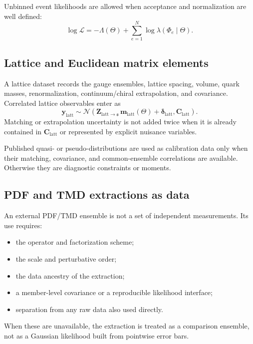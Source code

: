 \documentclass[11pt]{article}
\newcommand{\cL}{\mathcal L}
\newcommand{\latt}{\mathrm{latt}}
\begin{document}
Unbinned event likelihoods are allowed when acceptance and normalization are
well defined:
\begin{equation}
 \log\cL
 =
 -\Lambda(\Theta)
 +\sum_{e=1}^{N}
 \log\lambda(\Phi_e\mid\Theta).
 \label{eq:extended-unbinned}
\end{equation}

\subsection{Lattice and Euclidean matrix elements}

A lattice dataset records the gauge ensembles, lattice spacing, volume, quark
masses, renormalization, continuum/chiral extrapolation, and covariance.
Correlated lattice observables enter as
\begin{equation}
 \bm y_{\latt}
 \sim
 \mathcal N\!\left(
 \bm Z_{\latt\to\mathfrak s}\,
 \bm m_{\latt}(\Theta)
 +\bm\delta_{\latt},
 \bm C_{\latt}
 \right).
 \label{eq:lattice-likelihood}
\end{equation}
Matching or extrapolation uncertainty is not added twice when it is already
contained in \(\bm C_{\latt}\) or represented by explicit nuisance variables.

Published quasi- or pseudo-distributions are used as calibration data only
when their matching, covariance, and common-ensemble correlations are
available.  Otherwise they are diagnostic constraints or moments.

\subsection{PDF and TMD extractions as data}

An external PDF/TMD ensemble is not a set of independent measurements.  Its
use requires:
\begin{itemize}
\item the operator and factorization scheme;
\item the scale and perturbative order;
\item the data ancestry of the extraction;
\item a member-level covariance or a reproducible likelihood interface;
\item separation from any raw data also used directly.
\end{itemize}
When these are unavailable, the extraction is treated as a comparison
ensemble, not as a Gaussian likelihood built from pointwise error bars.
\end{document}
